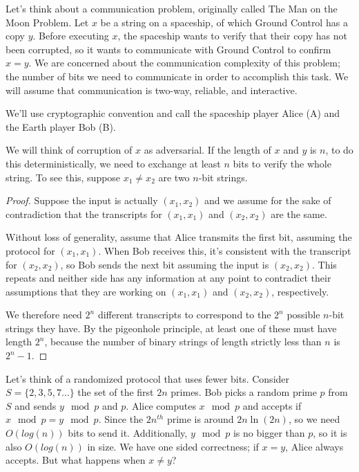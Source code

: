 Let's think about a communication problem, originally called The Man on the Moon Problem.  Let $x$ be a string on a spaceship, of which Ground Control has a copy $y$.  Before executing $x$, the spaceship wants to verify that their copy has not been corrupted, so it wants to communicate with Ground Control to confirm $x=y$.  We are concerned about the communication complexity of this problem; the number of bits we need to communicate in order to accomplish this task.  We will assume that communication is two-way, reliable, and interactive.

We'll use cryptographic convention and call the spaceship player Alice (A) and the Earth player Bob (B).

We will think of corruption of $x$ as adversarial.  If the length of $x$ and $y$ is $n$, to do this deterministically, we need to exchange at least $n$ bits to verify the whole string.  To see this, suppose $x_1\neq x_2$ are two $n$-bit strings.  


\begin{proof}
	
	Suppose the input is actually $(x_1,x_2)$ and we assume for the sake of contradiction that the transcripts for $(x_1,x_1)$ and $(x_2,x_2)$ are the same.
	
	Without loss of generality, assume that Alice transmits the first bit, assuming the protocol for $(x_1,x_1)$.  When Bob receives this, it's consistent with the transcript for $(x_2,x_2)$, so Bob sends the next bit assuming the input is $(x_2,x_2)$.  This repeats and neither side has any information at any point to contradict their assumptions that they are working on $(x_1,x_1)$ and $(x_2,x_2)$, respectively.
	
	We therefore need $2^n$ different transcripts to correspond to the $2^n$ possible $n$-bit strings they have.  By the pigeonhole principle, at least one of these must have length $2^n$, because the number of binary strings of length strictly less than $n$ is $2^n -1$.
	
	
	
\end{proof}


Let's think of a randomized protocol that uses fewer bits.  Consider $S=\{2,3,5,7\dots\}$ the set of the first $2n$ primes.  Bob picks a random prime $p$ from $S$ and sends $y\mod p$ and $p$.  Alice computes $x\mod p$ and accepts if $x\mod p = y\mod p$.  Since the $2n^{th}$ prime is around $2n\ln(2n)$, so we need $O(log(n))$ bits to send it.  Additionally, $y\mod p$ is no bigger than $p$, so it is also $O(log(n))$ in size.  We have one sided correctness; if $x=y$, Alice always accepts.  But what happens when $x\neq y$?

